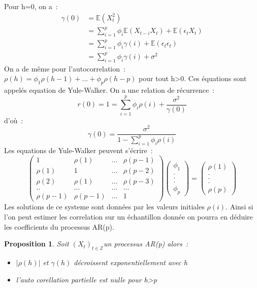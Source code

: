 \documentclass[11pt]{scrartcl} %
\newtheorem{pro}[theorem]{Proposition}
\newcommand{\Xt}{$\left(X_t\right)_{t\in\mathbb{Z}}$}
\begin{document}
Pour h=0, on a~:
\begin{align*}
\gamma(0)&= \mathbb{E}\left(X_t^2\right)\\
&= \sum_{i=1}^p\phi_i\mathbb{E}\left(X_{t-i}X_{t}\right)+\mathbb{E}\left(\epsilon_tX_{t}\right)\\
&= \sum_{i=1}^p\phi_i\gamma(i)+\mathbb{E}\left(\epsilon_t\epsilon_{t}\right)\\
&=\sum_{i=1}^p\phi_i\gamma(i)+\sigma^2
\end{align*}
On a de même pour l'autocorrelation~:~$\rho(h)=\phi_1\rho(h-1)+...+\phi_p\rho(h-p)$ pour tout h>0.
Ces équations sont appelés equation de Yule-Walker. 
On a une relation de récurrence~:
$$
r(0)=1=\sum_{i=1}^p\phi_i\rho(i)+\frac{\sigma^2}{\gamma(0)}
$$
d'où~:
$$
\gamma(0)=\frac{\sigma^2}{1-\sum_{i=1}^p\phi_i\rho(i)}
$$
Les equations de Yule-Walker peuvent s'écrire~:
$$
\left(
\begin{array}{cccc}
1 & \rho(1) & ... & \rho(p-1)\\
\rho(1) & 1 & ... &  \rho(p-2)\\
\rho(2) & \rho(1) & ... & \rho(p-3)\\
.. & ... & ... & ...\\
\rho(p-1) & \rho(p-1) & ... & 1
\end{array}
\right)
\left(
\begin{array}{c}
\phi_1\\
. \\
. \\
.\\
\phi_p
\end{array}
\right)=\left(
\begin{array}{c}
\rho(1)\\
. \\
. \\
.\\
\rho(p)
\end{array}
\right)
$$
Les solutions de ce systeme sont données par les valeurs initiales $\rho(i)$. Ainsi si l'on peut estimer les correlation sur un échantillon donnée on pourra en déduire les coefficients du processus AR(p).
\begin{pro}
Soit \Xt un processus AR(p) alors~:
\begin{itemize}
\item[i)] $|\rho(h)|$ et $\gamma(h)$ décroissent exponentiellement avec h\\
\item[ii)] l'auto corellation partielle est nulle pour h>p
\end{itemize}
\end{pro}
\end{document}
